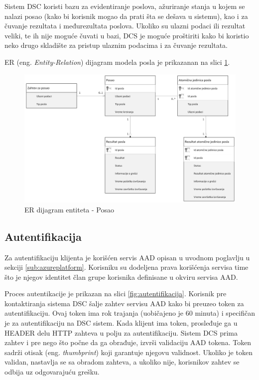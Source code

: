 \documentclass[12pt,oneside]{memoir}
\begin{document}
Sistem DSC koristi bazu za evidentiranje poslova, ažuriranje stanja u kojem se nalazi posao (kako bi korisnik mogao da prati šta se dešava u sistemu), kao i za čuvanje rezultata i međurezultata poslova. Ukoliko su ulazni podaci ili rezultat veliki, te ih nije moguće čuvati u bazi, DCS je moguće proštiriti kako bi koristio neko drugo skladište za pristup ulaznim podacima i za čuvanje rezultata.

ER (eng. \emph{Entity-Relation}) dijagram modela posla je prikazanan na slici \ref{fig:erposao}.

\begin{figure}[!ht]
  \centering
  \includegraphics[width=1.0\textwidth]{./images/uml_er_dijagram_posao.png}
  \caption{ER dijagram entiteta - Posao}
  \label{fig:erposao}
\end{figure}


\subsection{Autentifikacija}

Za autentifikaciju klijenta je korišćen servis AAD \cite{AAD} opisan u uvodnom poglavlju u sekciji \ref{sub:azureplatform}. Korisniku su dodeljena prava korišćenja servisa time što je njegov identitet član grupe korisnika definisane u okviru servisa AAD.

Proces autentikacije je prikazan na slici \ref{fig:autentifikacija}. Korisnik pre kontaktiranja sistema DSC šalje zahtev servisu AAD kako bi preuzeo token za autentifikaciju. Ovaj token ima rok trajanja (uobičajeno je 60 minuta) i specifičan je za autentifikaciju na DSC sistem. Kada klijent ima token, prosleđuje ga u HEADER delu HTTP zahteva u polju za autentifikaciju. Sistem DCS prima zahtev i pre nego što počne da ga obrađuje, izvrši validaciju AAD tokena. Token sadrži otisak (eng. \emph{thumbprint}) koji garantuje njegovu validnost. Ukoliko je token validan, nastavlja se sa obradom zahteva, a ukoliko nije, korisnikov zahtev se odbija uz odgovarajuću grešku.
\end{document}
